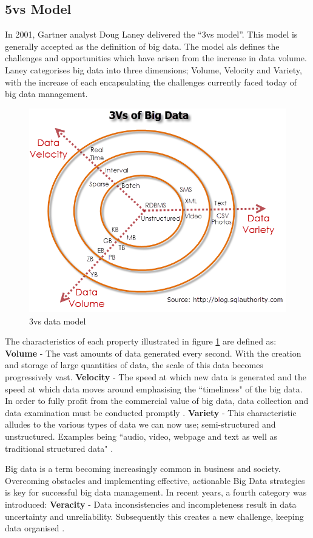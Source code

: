 \subsection{5vs Model}\label{5vs}
In 2001, Gartner analyst Doug Laney delivered the ``3vs model''. This model is generally accepted as the definition of big data. The model als defines the challenges and opportunities which have arisen from the increase in data volume. Laney categorises big data into three dimensions; Volume, Velocity and Variety, with the increase of each encapsulating the challenges currently faced today of big data management. \begin{figure}[h]\begin{center}\includegraphics[width=0.8\linewidth]{images/3vs}\caption{3vs data model}\label{fig:3vs}\end{center}\end{figure}
\parindent 0pt
The characteristics of each property illustrated in figure \ref{fig:3vs} are defined as: \textbf{Volume} - The vast amounts of data generated every second. With the creation and storage of large quantities of data, the scale of this data becomes progressively vast. \textbf{Velocity} -  The speed at which new data is generated and the speed at which data moves around emphasising the ``timeliness" of the big data. In order to fully profit from the commercial value of big data, data collection and data examination must be conducted promptly . \textbf{Variety} - This characteristic alludes to the various types of data we can now use; semi-structured and unstructured. Examples being ``audio, video, webpage and text as well as traditional structured data" \cite{bigdata}.

\parindent 15pt
Big data is a term becoming increasingly common in business and society. Overcoming obstacles and implementing effective, actionable Big Data strategies is key for successful big data management. In recent years, a fourth category was introduced: \textbf{Veracity} - Data inconsistencies and incompleteness result in data uncertainty and unreliability. Subsequently this creates a new challenge, keeping data organised \cite{bigdata}.

